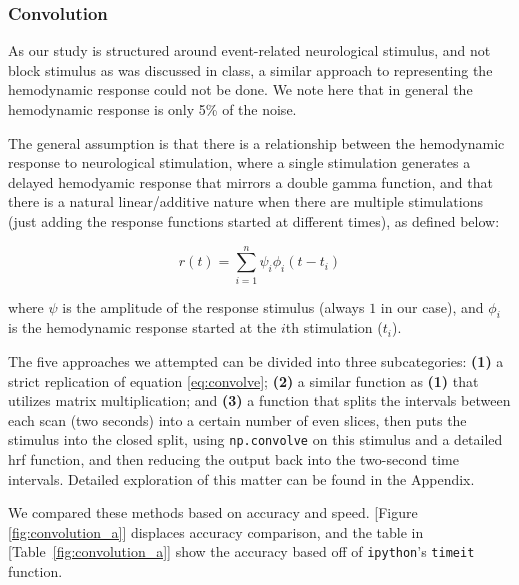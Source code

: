 \subsubsection{Convolution}
\par \indent As our study is structured around event-related neurological 
stimulus, and not block stimulus as was discussed in class, a similar 
approach to representing the hemodynamic response could not be done. 
We note here that in general the hemodynamic response is only 5\% of 
the noise.

The general assumption is that there is a relationship between the 
hemodynamic response to neurological stimulation, where a single 
stimulation generates a delayed hemodyamic response that mirrors 
a double gamma function, and that there is a natural linear/additive 
nature when there are multiple stimulations (just adding the response 
functions started at different times), as defined below:

\begin{equation} \label{eq:convolve}
r(t)= \sum_{i=1}^n \psi_{i} \phi_{i}(t-t_i)
\end{equation}

\noindent where $\psi$ is the amplitude of the response stimulus (always $1$ 
in our case), and $\phi_{i}$ is the hemodynamic response started at the $i$th 
stimulation ($t_i$).

The five approaches we attempted can be divided into three subcategories: 
\textbf{(1)} a strict replication of equation \ref{eq:convolve}; \textbf{(2)} 
a similar function as \textbf{(1)} that utilizes matrix multiplication; and 
\textbf{(3)} a function that splits the intervals between each scan (two 
seconds) into a certain number of even slices, then puts the stimulus into the 
closed split, using \texttt{np.convolve} on this stimulus and a detailed hrf 
function, and then reducing the output back into the two-second time intervals. 
Detailed exploration of this matter can be found in the Appendix.

We compared these methods based on accuracy and speed. [Figure 
\ref{fig:convolution_a}] displaces accuracy comparison, and the table in 
[Table~\ref{fig:convolution_a}] show the accuracy based off of 
\texttt{ipython}'s \texttt{timeit} function.



